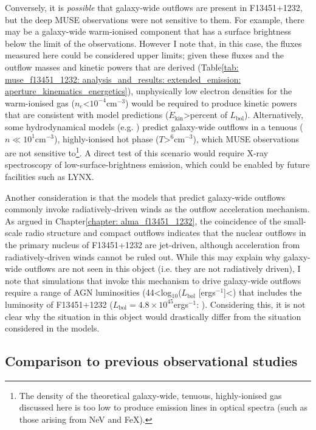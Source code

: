 Conversely, it is \textit{possible} that galaxy-wide outflows are present in F13451+1232, but the deep MUSE observations were not sensitive to them. For example, there may be a galaxy-wide warm-ionised component that has a surface brightness below the limit of the observations. However I note that, in this case, the fluxes measured here could be considered upper limits; given these fluxes and the outflow masses and kinetic powers that are derived (Table\;\ref{tab: muse_f13451_1232: analysis_and_results: extended_emission: aperture_kinematics_energetics}), unphysically low electron densities for the warm-ionised gas ($n_e$\;\textless\;$10^{-4}$\;cm$^{-3}$) would be required to produce kinetic powers that are consistent with model predictions ($\dot{E}_\mathrm{kin}$\;\textgreater{}\;per\;cent of $L_\mathrm{bol}$). Alternatively, some hydrodynamical models (e.g. \citealt{Costa2015, Costa2018, Curtis2016, Barai2018}) predict galaxy-wide outflows in a tenuous ($n\ll10^1$\;cm$^{-3}$), highly-ionised hot phase ($T$\;\textgreater{}$^6$\;cm$^{-3}$), which MUSE observations are not sensitive to\footnote{The density of the theoretical galaxy-wide, tenuous, highly-ionised gas discussed here is too low to produce emission lines in optical spectra (such as those arising from Ne\;V and Fe\;X).}. A direct test of this scenario would require X-ray spectroscopy of low-surface-brightness emission, which could be enabled by future facilities such as LYNX.

Another consideration is that the models that predict galaxy-wide outflows commonly invoke radiatively-driven winds as the outflow acceleration mechanism. As argued in Chapter\;\ref{chapter: alma_f13451_1232}, the coincidence of the small-scale radio structure and compact outflows indicates that the nuclear outflows in the primary nucleus of F13451+1232 are jet-driven, although acceleration from radiatively-driven winds cannot be ruled out. While this may explain why galaxy-wide outflows are not seen in this object (i.e. they are not radiatively driven), I note that simulations that invoke this mechanism to drive galaxy-wide outflows require a range of AGN luminosities (44\;\textless\;log$_{10}$($L_\mathrm{bol}$ [erg\;s$^{-1}$]\;\textless{}) that includes the luminosity of F13451+1232 ($L_\mathrm{bol}=4.8\times10^{45}$\;erg\;s$^{-1}$: \citealt{Rose2018}). Considering this, it is not clear why the situation in this object would drastically differ from the situation considered in the models. 

\subsection{Comparison to previous observational studies}
\label{section: muse_f13451_1232: discussion: comparison_to_observational_studies}

